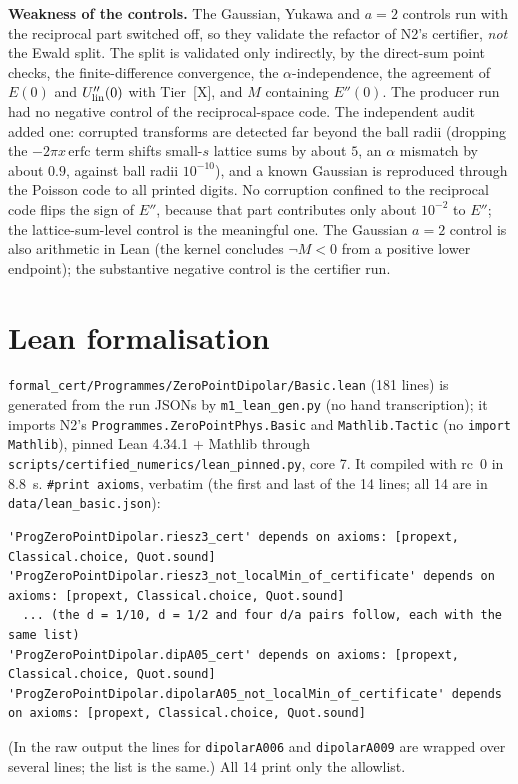 \documentclass[11pt]{article}
\newcommand{\tier}[1]{\textsf{[#1]}}
\newcommand{\tX}{\tier{X}}
\newcommand{\lean}[1]{\texttt{#1}}
\begin{document}
\textbf{Weakness of the controls.} The Gaussian, Yukawa and $a=2$ controls run with the reciprocal part switched off, so they validate the refactor of N2's certifier, \emph{not} the Ewald split. The split is validated only indirectly, by the direct-sum point checks, the finite-difference convergence, the $\alpha$-independence, the agreement of $E(0)$ and $U_{\rm lin}''(0)$ with Tier~\tX, and $M$ containing $E''(0)$. The producer run had no negative control of the reciprocal-space code. The independent audit added one: corrupted transforms are detected far beyond the ball radii (dropping the $-2\pi x\,\mathrm{erfc}$ term shifts small-$s$ lattice sums by about $5$, an $\alpha$ mismatch by about $0.9$, against ball radii $10^{-10}$), and a known Gaussian is reproduced through the Poisson code to all printed digits. No corruption confined to the reciprocal code flips the sign of $E''$, because that part contributes only about $10^{-2}$ to $E''$; the lattice-sum-level control is the meaningful one. The Gaussian $a=2$ control is also arithmetic in Lean (the kernel concludes $\neg M<0$ from a positive lower endpoint); the substantive negative control is the certifier run.

\section{Lean formalisation}\label{sec:lean}
\texttt{formal\_cert/Programmes/ZeroPointDipolar/Basic.lean} (181 lines) is generated from the run JSONs by \texttt{m1\_lean\_gen.py} (no hand transcription); it imports N2's \lean{Programmes.ZeroPointPhys.Basic} and \lean{Mathlib.Tactic} (no \lean{import Mathlib}), pinned Lean 4.34.1 + Mathlib through \texttt{scripts/certified\_numerics/lean\_pinned.py}, core 7. It compiled with rc~0 in 8.8~s. \lean{\#print axioms}, verbatim (the first and last of the 14 lines; all 14 are in \texttt{data/lean\_basic.json}):
\begin{lstlisting}
'ProgZeroPointDipolar.riesz3_cert' depends on axioms: [propext, Classical.choice, Quot.sound]
'ProgZeroPointDipolar.riesz3_not_localMin_of_certificate' depends on axioms: [propext, Classical.choice, Quot.sound]
  ... (the d = 1/10, d = 1/2 and four d/a pairs follow, each with the same list)
'ProgZeroPointDipolar.dipA05_cert' depends on axioms: [propext, Classical.choice, Quot.sound]
'ProgZeroPointDipolar.dipolarA05_not_localMin_of_certificate' depends on axioms: [propext, Classical.choice, Quot.sound]
\end{lstlisting}
(In the raw output the lines for \lean{dipolarA006} and \lean{dipolarA009} are wrapped over several lines; the list is the same.) All 14 print only the allowlist.
\end{document}
